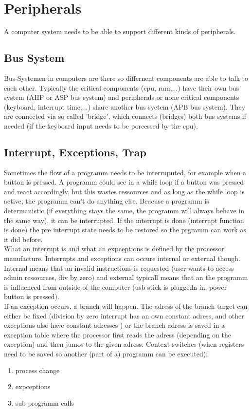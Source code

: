 \documentclass[a4paper]{scrartcl}
\begin{document}
    \section{Peripherals}
        A computer system needs to be able to support different kinds of peripherals. 
            \subsection{Bus System}
            Bus-Systemen in computers are there so differnent components are able to talk to each other. Typically the critical components (cpu, ram,...) have 
            their own bus system (AHP or ASP bus system) and peripherals or none critical components (keyboard, interrupt time,...) share another bus syetem (APB bus system).
            They are connected via so called 'bridge', which connects (bridges) both bus systems if needed (if the keyboard input needs to be porcessed by the cpu). 
            \subsection{Interrupt, Exceptions, Trap}
            Sometimes the flow of a programm needs to be interruputed, for example when a button is pressed. A programm could see in a while loop if a button was pressed and react 
            accordingly, but this wastes ressources and as long as the while loop is active, the programm can't do anything else. Beacuse a programm is determanistic (if everything stays the
            same, the programm will always behave in the same way), it can be interrupted. If the interrupt is done (interrupt function is done) the pre interrupt state needs to be 
            restored so the prgramm can work as it did before. \\
            What an interrupt is and what an expceptions is defined by the processor manufacture. Interrupts and exceptions can occure internal or external though.
            Internal means that an invalid instructions is requested (user wants to access admin ressources, div by zero) and external typicall means that an 
            the programm is influenced from outside of the computer (usb stick is pluggedn in, power button is pressed). \\
            If an exception occurs, a branch will happen. The adress of the branch target can either be fixed (division by zero interrupt has an own constant adress, and other
            exceptions also have constant adresses ) or the branch adress is saved in a exception table where the processor first reads the adress (depending on the exception) 
            and then jumos to the given adress.
            Context switches (when registers need to be saved so another (part of a) programm can be executed): 
            \begin{enumerate}
                \item process change
                \item expceptions
                \item sub-programm calls
            \end{enumerate}   
\end{document}
